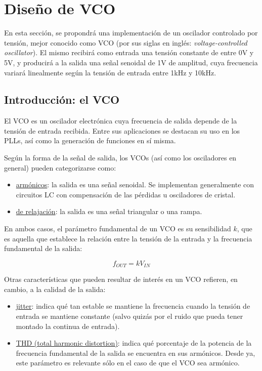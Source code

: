 \documentclass[../../tc_tp6_main.tex]{subfiles}
\begin{document}
\chapter{Dise\~no de VCO}

En esta secci\'on, se propondr\'a una implementaci\'on de un oscilador controlado por tensi\'on, mejor conocido como VCO (por sus siglas en ingl\'es: \textit{voltage-controlled oscillator}). El mismo recibir\'a como entrada una tensi\'on constante de entre 0V y 5V, y producir\'a a la salida una se\~nal senoidal de 1V de amplitud, cuya frecuencia variar\'a linealmente seg\'un la tensi\'on de entrada entre 1kHz y 10kHz. 


\section{Introducci\'on: el VCO}

El VCO es un oscilador electr\'onica cuya frecuencia de salida depende de la tensi\'on de entrada recibida. Entre sus aplicaciones se destacan su uso en los PLLs, as\'i como la generaci\'on de funciones en s\'i misma.\par

Seg\'un la forma de la se\~nal de salida, los VCOs (as\'i como los osciladores en general) pueden categorizarse como:

\begin{itemize}
	\item \underline{arm\'onicos}: la salida es una se\~nal senoidal. Se implementan generalmente con circuitos LC con compensaci\'on de las p\'erdidas  u osciladores de cristal.
	\item \underline{de relajaci\'on}: la salida es una se\~nal triangular o una rampa.
\end{itemize}

En ambos casos, el par\'ametro fundamental de un VCO es su sensibilidad $k$, que es aquella que establece la relaci\'on entre la tensi\'on de la entrada y la frecuencia fundamental de la salida:

\begin{equation}
	f_{OUT} = k V_{IN}
\end{equation}

Otras caracter\'isticas que pueden resultar de inter\'es en un VCO refieren, en cambio, a la calidad de la salida:

\begin{itemize}
	\item \underline{jitter}: indica qu\'e tan estable se mantiene la frecuencia cuando la tensi\'on de entrada se mantiene constante (salvo quiz\'as por el ruido que pueda tener montado la continua de entrada).
	\item \underline{THD (total harmonic distortion)}: indica qu\'e porcentaje de la potencia de la frecuencia fundamental de la salida se encuentra en sus arm\'onicos. Desde ya, este par\'ametro es relevante s\'olo en el caso de que el VCO sea arm\'onico.
\end{itemize}
\end{document}

